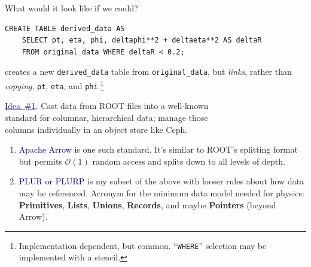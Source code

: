\documentclass[aspectratio=169]{beamer}
\begin{document}
\begin{frame}[fragile]{What would it look like if we could?}
\begin{verbatim}
CREATE TABLE derived_data AS
    SELECT pt, eta, phi, deltaphi**2 + deltaeta**2 AS deltaR
    FROM original_data WHERE deltaR < 0.2;
\end{verbatim}

creates a new {\tt derived\_data} table from {\tt original\_data}, but {\it links}, rather than {\it copying}, {\tt pt}, {\tt eta}, and {\tt phi}.\footnote{Implementation dependent, but common. ``{\tt WHERE}'' selection may be implemented with a stencil.}

\vspace{0.25 cm}

\vspace{0.5 cm}

\vspace{0.25 cm}
\end{frame}

\begin{frame}{}
\vspace{1 cm}
\begin{center}
\Large \textcolor{darkblue}{\underline{Idea~\#1}.} Cast data from ROOT files into a well-known \\ standard for columnar, hierarchical data; manage those \\ columns individually in an object store like Ceph.
\end{center}

\begin{enumerate}
\item<2-> \textcolor{darkblue}{Apache Arrow} is one such standard. It's similar to ROOT's splitting format but permits $\mathcal{O}(1)$ random access and splits down to all levels of depth.
\item<3-> \textcolor{darkblue}{PLUR or PLURP} is my subset of the above with looser rules about how data may be referenced. Acronym for the minimum data model needed for physics: {\bf Primitives}, {\bf Lists}, {\bf Unions}, {\bf Records}, and maybe {\bf Pointers} (beyond Arrow).
\end{enumerate}

\begin{center}
\end{center}
\end{frame}
\end{document}
